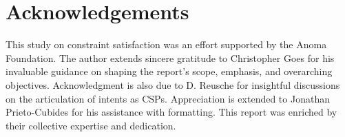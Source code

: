 \section{Acknowledgements}

This study on constraint satisfaction was an effort supported by the Anoma Foundation. The author extends sincere gratitude to Christopher Goes for his invaluable guidance on shaping the report's scope, emphasis, and overarching objectives. Acknowledgment is also due to D. Reusche for insightful discussions on the articulation of intents as CSPs. Appreciation is extended to Jonathan Prieto-Cubides for his assistance with formatting. This report was enriched by their collective expertise and dedication.
